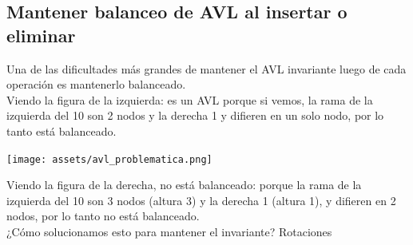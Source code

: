 \documentclass[10pt,a4paper]{article}
\begin{document}
\subsection*{Mantener balanceo de AVL al insertar o eliminar}
Una de las dificultades más grandes de mantener el AVL invariante luego de cada operación es mantenerlo balanceado. \\
Viendo la figura de la izquierda: es un AVL porque si vemos, la rama de la izquierda del 10 son 2 nodos y la derecha 1 y difieren en un solo nodo, por lo tanto está balanceado. 
\begin{center}
    \begin{minipage}[b]{0.7\textwidth}
        \texttt{[image: assets/avl\_problematica.png]}
        \centering
        \label{fig:avl_problematica}
    \end{minipage}
\end{center}
Viendo la figura de la derecha, no está balanceado: porque la rama de la izquierda del 10 son 3 nodos (altura 3) y la derecha 1 (altura 1), y difieren en 2 nodos, por lo tanto no está balanceado. \\
¿Cómo solucionamos esto para mantener el invariante? Rotaciones
\newpage
\end{document}
